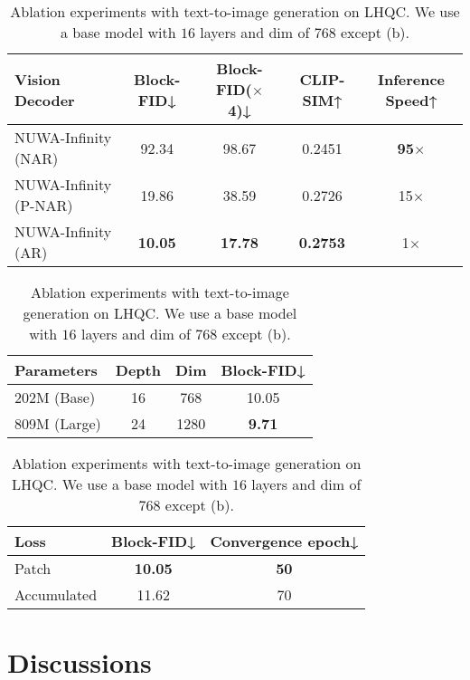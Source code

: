 \documentclass{article}
\begin{document}
\begin{table}[t!] 
\small
\begin{subtable}{1.\textwidth}
\centering 
\begin{tabular}{lcccc} 
\toprule
Vision Decoder & Block-FID↓ & Block-FID($\times$ 4)↓ & CLIP-SIM↑ & Inference Speed↑ \\ \hline
NUWA-Infinity (NAR)   & 92.34 & 98.67 & 0.2451  & \textbf{95}$\times$ \\
NUWA-Infinity (P-NAR) & 19.86 & 38.59 & 0.2726  & 15$\times$          \\
NUWA-Infinity (AR)    & \textbf{10.05} & \textbf{17.78} & \textbf{0.2753}    & 1$\times$  \\
\bottomrule
\end{tabular}
\caption{Decoder model.}
\label{tab:rendermodel}
\end{subtable}
\begin{subtable}{.48\linewidth}
\setlength{\tabcolsep}{4.5pt}
\begin{tabular}{lccc}
\toprule
Parameters  & Depth & Dim  & Block-FID↓ \\ \hline
202M (Base)  & 16    & 768  & 10.05      \\
809M (Large) & 24    & 1280 & \textbf{9.71}  \\
\bottomrule
\end{tabular}
\caption{Decoder size.}
\label{tab:modelsize}
\end{subtable}
\hspace{0.6em}
\begin{subtable}{.45\linewidth}
\setlength{\tabcolsep}{1.5pt}
\centering
\begin{tabular}{lcc}
\toprule
Loss  & Block-FID↓ & Convergence epoch↓ \\ \hline
Patch & \textbf{10.05}         & \textbf{50}                 \\
Accumulated  & 11.62         & 70   \\ 
\bottomrule
\end{tabular}
\caption{Decoder loss.}
\label{tab:lossregion}
\end{subtable}
\caption{Ablation experiments with text-to-image generation on LHQC. We use a base model with $16$ layers and dim of $768$ except (b). } \label{tab:ablation_five}
\end{table}

\section{Discussions}
\end{document}
